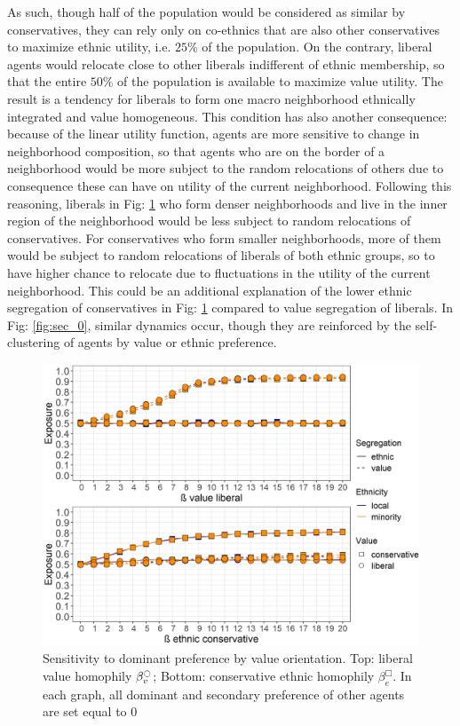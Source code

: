 \documentclass{article}
\begin{document}
As such, though half of the population would be considered as similar by conservatives, they can rely only on co-ethnics that are also other conservatives to maximize ethnic utility, i.e. $25 \%$ of the population. On the contrary, liberal agents would relocate close to other liberals indifferent of ethnic membership, so that the entire $50 \%$ of the population is available to maximize value utility. The result is a tendency for liberals to form one macro neighborhood ethnically integrated and value homogeneous. This condition has also another consequence: because of the linear utility function, agents are more sensitive to change in neighborhood composition, so that agents who are on the border of a neighborhood would be more subject to the random relocations of others due to consequence these can have on utility of the current neighborhood. Following this reasoning, liberals in Fig: \ref{fig:comb_val} who form denser neighborhoods and live in the inner region of the neighborhood would be less subject to random relocations of conservatives. For conservatives who form smaller neighborhoods, more of them would be subject to random relocations of liberals of both ethnic groups, so to have higher chance to relocate due to fluctuations in the utility of the current neighborhood. This could be an additional explanation of the lower ethnic segregation of conservatives in Fig: \ref{fig:comb_val} compared to value segregation of liberals. In Fig: \ref{fig:sec_0}, similar dynamics occur, though they are reinforced by the self-clustering of agents by value or ethnic preference.

\begin{figure}[H]
    \centering
    \includegraphics[scale=0.5]{material/figures/comb_val.jpg}
    \caption{Sensitivity to dominant preference by value orientation. Top: liberal value homophily $\beta^{\ocircle}_v$; Bottom: conservative ethnic homophily $\beta^{\Box}_e$. In each graph, all dominant and secondary preference of other agents are set equal to 0}
    \label{fig:comb_val}
\end{figure} %
\end{document}
